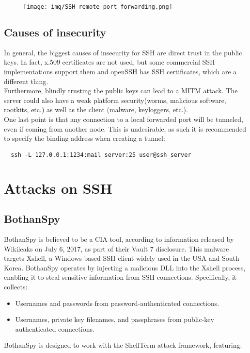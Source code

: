 \begin{figure}[H]
  \centering
  \texttt{[image: img/SSH remote port
  forwarding.png]}
\end{figure}

\subsection{Causes of insecurity}
In general, the biggest causes of insecurity for SSH are direct trust
in the public keys. In fact, x.509 certificates are not used, but some
commercial SSH implementations support them and openSSH has SSH 
certificates, which are a different thing.\\
Furthermore, blindly trusting the public keys can lead to a MITM 
attack. The server could also have a weak platform security(worms,
malicious software, rootkits, etc.) as well as the client (malware,
keyloggers, etc.).\\
One last point is that any connection to a local forwarded port will
be tunneled, even if coming from another node. This is undesirable, as
such it is recommended to specify the binding address when creating a
tunnel:
\begin{verbatim}
  ssh -L 127.0.0.1:1234:mail_server:25 user@ssh_server
\end{verbatim}
\section{Attacks on SSH}
\subsection{BothanSpy}
BothanSpy is believed to be a CIA tool, according to information
released by Wikileaks on July 6, 2017, as part of their Vault 7
disclosure. This malware targets Xshell, a Windows-based SSH client
widely used in the USA and South Korea. BothanSpy operates by
injecting a malicious DLL into the Xshell process, enabling it to
steal sensitive information from SSH connections. Specifically, it
collects:

\begin{itemize}
    \item Usernames and passwords from password-authenticated
      connections.
    \item Usernames, private key filenames, and passphrases from
      public-key authenticated connections.
\end{itemize}

BothanSpy is designed to work with the ShellTerm attack framework,
featuring:


